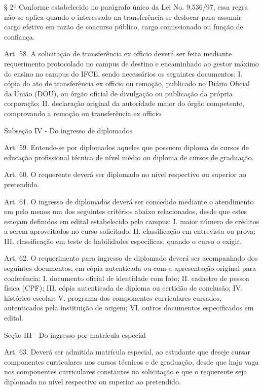 {§ 2º Conforme estabelecido no parágrafo único da Lei No. 9.536/97, essa regra não se aplica quando o interessado na transferência se deslocar para assumir cargo efetivo em razão de concurso público, cargo comissionado ou função de confiança.

Art. 58. A solicitação de transferência ex officio deverá ser feita mediante requerimento protocolado no campus de destino e encaminhado ao gestor máximo do ensino no campus do IFCE, sendo necessários os seguintes documentos:
I. cópia do ato de transferência ex officio ou remoção, publicado no Diário Oficial da União (DOU), ou órgão oficial de divulgação ou publicação da própria corporação;
II. declaração original da autoridade maior do órgão competente, comprovando a remoção ou transferência ex officio.

\begin{center}
	Subseção IV - Do ingresso de diplomados
\end{center}

Art. 59. Entende-se por diplomados aqueles que possuem diploma de cursos de educação profissional técnica de nível médio ou diploma de cursos de graduação.

Art. 60. O requerente deverá ser diplomado no nível respectivo ou superior ao pretendido.

Art. 61. O ingresso de diplomados deverá ser concedido mediante o atendimento em pelo menos um dos seguintes critérios abaixo relacionados, desde que estes estejam definidos em edital estabelecido pelo campus:
I. maior número de créditos a serem aproveitados no curso solicitado;
II. classificação em entrevista ou prova;
III. classificação em teste de habilidades específicas, quando o curso o exigir.

Art. 62. O requerimento para ingresso de diplomado deverá ser acompanhado dos seguintes documentos, em cópia autenticada ou com a apresentação original para conferência:
I. documento oficial de identidade com foto;
II. cadastro de pessoa física (CPF);
III. cópia autenticada de diploma ou certidão de conclusão;
IV. histórico escolar;
V. programa dos componentes curriculares cursados, autenticados pela instituição de origem;
VI. outros documentos especificados em edital.

\begin{center}
	Seção III - Do ingresso por matrícula especial
\end{center}

Art. 63. Deverá ser admitida matrícula especial, ao estudante que deseje cursar componentes curriculares nos cursos técnicos e de graduação, desde que haja vaga nos componentes curriculares constantes na solicitação e que o requerente seja diplomado no nível respectivo ou superior ao pretendido.

}
